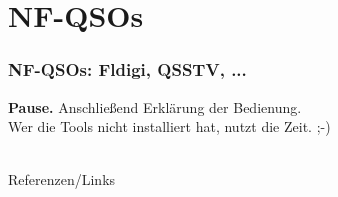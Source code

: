 \section{NF-QSOs}

\begin{frame}
    \frametitle{NF-QSOs: Fldigi, QSSTV, ...}

    \Large \textbf{Pause.}
    \normalsize Anschließend Erklärung der Bedienung. \\[2em]


    Wer die Tools nicht installiert hat, nutzt die Zeit. ;-)


\end{frame}

\renewcommand{\refname}{Referenzen}

\hypertarget{refs}{}
\textcolor{white}{} \\ %
\Large Referenzen/Links
\footnotesize

